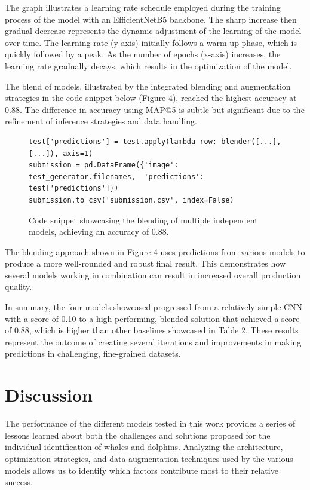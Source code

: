 \documentclass[twocolumn]{article}
\begin{document}
The graph illustrates a learning rate schedule employed during the training process of the model with an EfficientNetB5 backbone. The sharp increase then gradual decrease represents the dynamic adjustment of the learning of the model over time. The learning rate (y-axis) initially follows a warm-up phase, which is quickly followed by a peak. As the number of epochs (x-axis) increases, the learning rate gradually decays, which results in the optimization of the model. 

The blend of models, illustrated by the integrated blending and augmentation strategies in the code snippet below (Figure 4), reached the highest accuracy at 0.88. The difference in accuracy using MAP@5 is subtle but significant due to the refinement of inference strategies and data handling.

\begin{figure}[h!]
\centering
\begin{minipage}{0.99\linewidth}
\begin{lstlisting}
test['predictions'] = test.apply(lambda row: blender([...], [...]), axis=1)
submission = pd.DataFrame({'image': test_generator.filenames,  'predictions': test['predictions']})
submission.to_csv('submission.csv', index=False)
\end{lstlisting}
\end{minipage}
\caption{Code snippet showcasing the blending of multiple independent models, achieving an accuracy of 0.88.}
\end{figure}

The blending approach shown in Figure 4 uses predictions from various models to produce a more well-rounded and robust final result. This demonstrates how several models working in combination can result in increased overall production quality.

In summary, the four models showcased progressed from a relatively simple CNN with a score of 0.10 to a high-performing, blended solution that achieved a score of 0.88, which is higher than other baselines showcased in Table 2. These results represent the outcome of creating several iterations and improvements in making predictions in challenging, fine-grained datasets.

\section{Discussion}

The performance of the different models tested in this work provides a series of lessons learned about both the challenges and solutions proposed for the individual identification of whales and dolphins. Analyzing the architecture, optimization strategies, and data augmentation techniques used by the various models allows us to identify which factors contribute most to their relative success.
\end{document}
